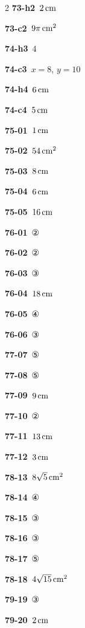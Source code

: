 \documentclass[10pt,a4paper]{article}
\begin{document}
\begin{multicols}{2}
\noindent\textbf{73-h2}\ $2\mkern3mu \mathrm{cm}$\par
\noindent\textbf{73-c2}\ $9\pi\mkern3mu \mathrm{cm}^2$\par
\noindent\textbf{74-h3}\ $4$\par
\noindent\textbf{74-c3}\ $x=8$, $y=10$\par
\noindent\textbf{74-h4}\ $6\mkern3mu \mathrm{cm}$\par
\noindent\textbf{74-c4}\ $5\mkern3mu \mathrm{cm}$\par
\noindent\textbf{75-01}\ $1\mkern3mu \mathrm{cm}$\par
\noindent\textbf{75-02}\ $54\mkern3mu \mathrm{cm}^2$\par
\noindent\textbf{75-03}\ $8\mkern3mu \mathrm{cm}$\par
\noindent\textbf{75-04}\ $6\mkern3mu \mathrm{cm}$\par
\noindent\textbf{75-05}\ $16\mkern3mu \mathrm{cm}$\par
\noindent\textbf{76-01}\ ②\par
\noindent\textbf{76-02}\ ②\par
\noindent\textbf{76-03}\ ③\par
\noindent\textbf{76-04}\ $18\mkern3mu \mathrm{cm}$\par
\noindent\textbf{76-05}\ ④\par
\noindent\textbf{76-06}\ ③\par
\noindent\textbf{77-07}\ ⑤\par
\noindent\textbf{77-08}\ ⑤\par
\noindent\textbf{77-09}\ $9\mkern3mu \mathrm{cm}$\par
\noindent\textbf{77-10}\ ②\par
\noindent\textbf{77-11}\ $13\mkern3mu \mathrm{cm}$\par
\noindent\textbf{77-12}\ $3\mkern3mu \mathrm{cm}$\par
\noindent\textbf{78-13}\ $8\sqrt{5}\mkern3mu \mathrm{cm}^2$\par
\noindent\textbf{78-14}\ ④\par
\noindent\textbf{78-15}\ ③\par
\noindent\textbf{78-16}\ ③\par
\noindent\textbf{78-17}\ ⑤\par
\noindent\textbf{78-18}\ $4\sqrt{15}\mkern3mu \mathrm{cm}^2$\par
\noindent\textbf{79-19}\ ③\par
\noindent\textbf{79-20}\ $2\mkern3mu \mathrm{cm}$\par

\end{multicols}
\end{document}
